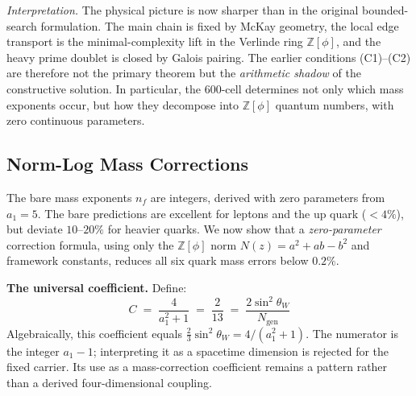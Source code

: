 \documentclass[12pt,a4paper]{article}
\theoremstyle{definition}
\begin{document}
\noindent\textit{Interpretation.}
The physical picture is now sharper than in the original bounded-search formulation.  The main chain is fixed by McKay geometry, the local edge transport is the minimal-complexity lift in the Verlinde ring $\mathbb{Z}[\phi]$, and the heavy prime doublet is closed by Galois pairing.  The earlier conditions (C1)--(C2) are therefore not the primary theorem but the \emph{arithmetic shadow} of the constructive solution.  In particular, the 600-cell determines not only which mass exponents occur, but how they decompose into $\mathbb{Z}[\phi]$ quantum numbers, with zero continuous parameters.


\subsection{Norm-Log Mass Corrections}
\label{sec:normlog}

The bare mass exponents $n_f$ are integers, derived with zero parameters from $a_1 = 5$. The bare predictions are excellent for leptons and the up quark ($< 4\%$), but deviate $10$--$20\%$ for heavier quarks. We now show that a \emph{zero-parameter} correction formula, using only the $\mathbb{Z}[\phi]$ norm $N(z) = a^2 + ab - b^2$ and framework constants, reduces all six quark mass errors below $0.2\%$.

\textbf{The universal coefficient.} Define:
\begin{equation}
\boxed{C \;=\; \frac{4}{a_1^2 + 1} \;=\; \frac{2}{13} \;=\; \frac{2\sin^2\theta_W}{N_{\text{gen}}}}
\label{eq:normlog_coeff}
\end{equation}
Algebraically, this coefficient equals $\tfrac23\sin^2\theta_W=4/(a_1^2+1)$.  The numerator is the integer $a_1-1$; interpreting it as a spacetime dimension is rejected for the fixed carrier.  Its use as a mass-correction coefficient remains a pattern rather than a derived four-dimensional coupling.
\end{document}
